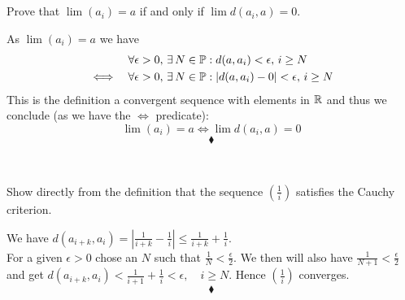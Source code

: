 \subsection{}
\begin{tcolorbox}
Prove that $\lim (a_i) = a$ if and only if $\lim d(a_i,a)= 0$.
\end{tcolorbox}
As $\lim (a_i) = a$ we have
\begin{align*}
&\forall \epsilon>0,\, \exists\, N\in\mathbb{P}: d(a,a_i)<\epsilon,\, i\geq N\\
\iff\quad&\forall \epsilon>0,\, \exists\, N\in\mathbb{P}: |d(a,a_i)-0|<\epsilon,\, i\geq N\\
\end{align*}
This is the definition a convergent sequence with elements in $\mathbb{R}$ and thus we conclude (as we have the $\iff$ predicate):
$$\lim (a_i) = a \iff \lim d(a_i,a)= 0$$
$$\blacklozenge$$\\
\newpage
\renewcommand{\thesubsection}{\thesection.\arabic{subsection}}
\setcounter{subsection}{0}




\subsection{}
\begin{tcolorbox}
Show directly from the definition that the sequence $\left(\frac{1}{i}\right)$ satisfies the Cauchy criterion.
\end{tcolorbox}
We have $d(a_{i+k}, a_{i})=|\frac{1}{i+k}-\frac{1}{i}|\leq \frac{1}{i+k}+\frac{1}{i} $.\\
For a given $\epsilon>0$ chose an $N$ such that $\frac{1}{N}<\frac{\epsilon}{2} $. We then will also have $\frac{1}{N+1}<\frac{\epsilon}{2} $ and get $d(a_{i+k}, a_{i})<\frac{1}{i+1}+\frac{1}{i}<\epsilon,\quad i\geq N$. Hence  $\left(\frac{1}{i}\right)$ converges.
$$\blacklozenge$$\\
